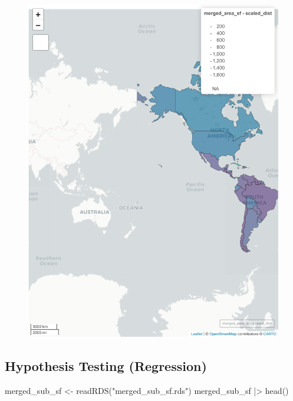 \documentclass[
  letterpaper,
  DIV=11,
  numbers=noendperiod]{scrartcl}
\newenvironment{Shaded}{\begin{snugshade}}{\end{snugshade}}
\newcommand{\FunctionTok}[1]{\textcolor[rgb]{0.28,0.35,0.67}{#1}}
\newcommand{\NormalTok}[1]{\textcolor[rgb]{0.00,0.23,0.31}{#1}}
\newcommand{\OtherTok}[1]{\textcolor[rgb]{0.00,0.23,0.31}{#1}}
\newcommand{\SpecialCharTok}[1]{\textcolor[rgb]{0.37,0.37,0.37}{#1}}
\newcommand{\StringTok}[1]{\textcolor[rgb]{0.13,0.47,0.30}{#1}}
\begin{document}
\begin{figure}[H]

{\centering \includegraphics{index_files/figure-pdf/plot-area-1.pdf}

}

\end{figure}

\hypertarget{hypothesis-testing-regression}{%
\subsection{Hypothesis Testing
(Regression)}\label{hypothesis-testing-regression}}

\begin{Shaded}
\begin{Highlighting}[]
\NormalTok{merged\_sub\_sf }\OtherTok{\textless{}{-}} \FunctionTok{readRDS}\NormalTok{(}\StringTok{"merged\_sub\_sf.rds"}\NormalTok{)}
\NormalTok{merged\_sub\_sf }\SpecialCharTok{|\textgreater{}} \FunctionTok{head}\NormalTok{()}
\end{Highlighting}
\end{Shaded}
\end{document}
